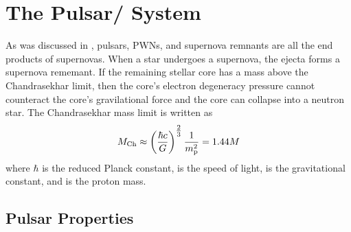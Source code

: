 \section{The Pulsar/ System}

As was discussed in , pulsars, \glspl{PWN},
and supernova remnants are all the end products of supernovas.  When a
star undergoes a supernova, the ejecta forms a supernova rememant.  If the
remaining stellar core has a mass above the Chandrasekhar limit,
then the core's electron degeneracy pressure cannot counteract the core's
gravilational force and the core can collapse into a neutron star.
The Chandrasekhar mass limit is written as \citep{chandrasekhar_1931_maximum-ideal}
\begin{equation}
  M_\text{Ch} \approx \left(\frac{\hbar c}{G}\right)^{\tfrac{2}{3}}
  \frac{1}{m_\text{p}^2}
  = 1.44 M
\end{equation}
where $\hbar$ is the reduced Planck constant, \speedoflight
is the speed of light, \gravitationalconstant is the gravitational
constant, and \protonmass is the proton mass.



\subsection{Pulsar Properties}








